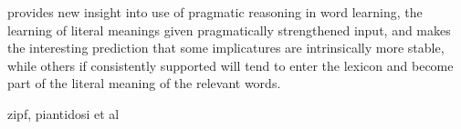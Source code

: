 \documentclass{article} %
\begin{document}
provides new insight into use of pragmatic reasoning in word learning, the learning of literal meanings given pragmatically strengthened input, and makes the interesting prediction that some implicatures are intrinsically more stable, while others if consistently supported will tend to enter the lexicon and become part of the literal meaning of the relevant words.

zipf, piantidosi et al




\newpage



\end{document}
